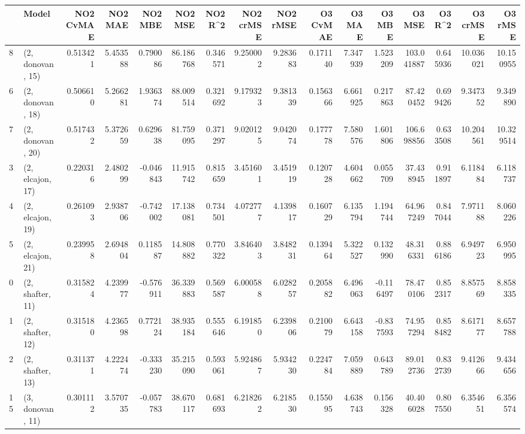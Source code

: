 \begin{tabular}{llrrrrrrrrrrrrrr}
\toprule
{} &             Model &  NO2 CvMAE &   NO2 MAE &   NO2 MBE &    NO2 MSE &   NO2 R\textasciicircum2 &  NO2 crMSE &  NO2 rMSE &  O3 CvMAE &    O3 MAE &    O3 MBE &      O3 MSE &    O3 R\textasciicircum2 &   O3 crMSE &    O3 rMSE \\
\midrule
8  &  (2, donovan, 15) &   0.513421 &  5.453588 &  0.790086 &  86.186768 &  0.346571 &   9.250002 &  9.283683 &  0.171140 &  7.347939 &  1.523209 &  103.041887 &  0.645936 &  10.036021 &  10.150955 \\
6  &  (2, donovan, 18) &   0.506610 &  5.266281 &  1.936374 &  88.009514 &  0.321692 &   9.179323 &  9.381339 &  0.156366 &  6.661925 &  0.217863 &   87.420452 &  0.699426 &   9.347352 &   9.349890 \\
7  &  (2, donovan, 20) &   0.517432 &  5.372659 &  0.629638 &  81.759095 &  0.371297 &   9.020125 &  9.042074 &  0.177778 &  7.580576 &  1.601806 &  106.698856 &  0.633508 &  10.204561 &  10.329514 \\
3  &  (2, elcajon, 17) &   0.220316 &  2.480299 & -0.046843 &  11.915742 &  0.815659 &   3.451601 &  3.451919 &  0.120728 &  4.604662 &  0.055709 &   37.438945 &  0.911897 &   6.118484 &   6.118737 \\
4  &  (2, elcajon, 19) &   0.261093 &  2.938706 & -0.742002 &  17.138081 &  0.734501 &   4.072777 &  4.139817 &  0.160729 &  6.135794 &  1.194744 &   64.967249 &  0.847044 &   7.971188 &   8.060226 \\
5  &  (2, elcajon, 21) &   0.239958 &  2.694804 &  0.118587 &  14.808882 &  0.770322 &   3.846403 &  3.848231 &  0.139464 &  5.322527 &  0.132990 &   48.316331 &  0.886186 &   6.949723 &   6.950995 \\
0  &  (2, shafter, 11) &   0.315824 &  4.239977 & -0.576911 &  36.339883 &  0.569587 &   6.000588 &  6.028257 &  0.205882 &  6.496063 & -0.116497 &   78.470106 &  0.852317 &   8.857569 &   8.858335 \\
1  &  (2, shafter, 12) &   0.315180 &  4.236598 &  0.772124 &  38.935184 &  0.555646 &   6.191850 &  6.239806 &  0.210079 &  6.643158 & -0.837593 &   74.957294 &  0.858482 &   8.617177 &   8.657788 \\
2  &  (2, shafter, 13) &   0.311371 &  4.222474 & -0.333230 &  35.215090 &  0.593061 &   5.924867 &  5.934230 &  0.224784 &  7.059889 &  0.643789 &   89.012736 &  0.832739 &   9.412666 &   9.434656 \\
15 &  (3, donovan, 11) &   0.301112 &  3.570735 & -0.057783 &  38.670117 &  0.681693 &   6.218262 &  6.218530 &  0.155095 &  4.638743 &  0.156328 &   40.406028 &  0.807550 &   6.354651 &   6.356574 \\

\end{tabular}
